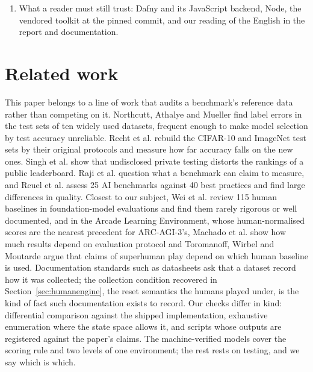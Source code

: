 \documentclass[11pt]{article}
\newcommand{\code}[1]{\texttt{#1}}
\begin{document}
\begin{enumerate}
      that ignored non-\code{ls20} game state, two hashing errors that merged or
      spuriously split states, an off-by-one in the lower bound, a
      peak-memory guard that let one heavy environment mark later ones as
      capped, an exposure measurement that sampled actions six environments
      never advertise, a cross-check that compared one seed where it needed
      all of them, a stated HTTP status (429) that no artefact supported, and a
      shortener's refusal reported as the replays not being locatable. Each
      invalidated something that was then re-run or cut.
\item What a reader must still trust: Dafny and its JavaScript backend, Node,
      the vendored toolkit at the pinned commit, and our reading of the English
      in the report and documentation.
\end{enumerate}

\section{Related work}

This paper belongs to a line of work that audits a benchmark's reference data
rather than competing on it. Northcutt, Athalye and Mueller
\cite{labelerrors} find label errors in the test sets of ten widely used
datasets, frequent enough to make model selection by test accuracy unreliable.
Recht et al. \cite{imagenetv2} rebuild the CIFAR-10 and ImageNet test sets by
their original protocols and measure how far accuracy falls on the new ones.
Singh et al. \cite{leaderboard} show that undisclosed private testing distorts
the rankings of a public leaderboard. Raji et al. \cite{everything} question
what a benchmark can claim to measure, and Reuel et al. \cite{betterbench}
assess 25 AI benchmarks against 40 best practices and find large differences in
quality. Closest to our subject, Wei et al. \cite{humanbaselines} review 115
human baselines in foundation-model evaluations and find them rarely rigorous or
well documented, and in the Arcade Learning Environment, whose human-normalised
scores are the nearest precedent for ARC-AGI-3's, Machado et al.
\cite{machado} show how much results depend on evaluation protocol and Toromanoff,
Wirbel and Moutarde \cite{toromanoff} argue that claims of superhuman play
depend on which human baseline is used. Documentation standards such as datasheets \cite{datasheets} ask that
a dataset record how it was collected; the collection condition recovered in
Section~\ref{sec:humanengine}, the reset semantics the humans played under, is
the kind of fact such documentation exists to record. Our checks differ in kind: differential comparison
against the shipped implementation, exhaustive enumeration where the state space
allows it, and scripts whose outputs are registered against the paper's claims.
The machine-verified models cover the scoring rule and two levels of one
environment; the rest rests on testing, and we say which is which.
\end{document}
